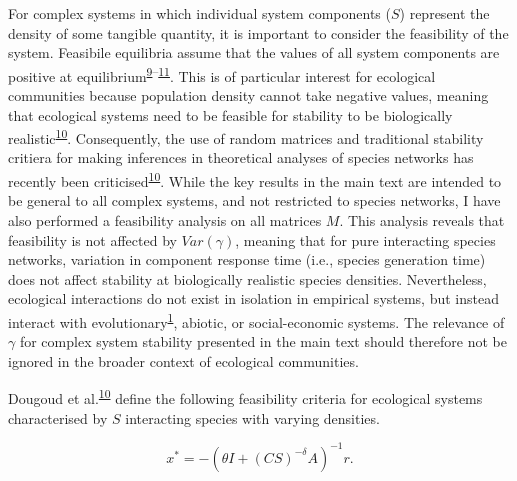 \documentclass[]{article}
\begin{document}
For complex systems in which individual system components (\(S\))
represent the density of some tangible quantity, it is important to
consider the feasibility of the system. Feasibile equilibria assume that
the values of all system components are positive at
equilibrium\textsuperscript{\protect\hyperlink{ref-Grilli2017}{9}--\protect\hyperlink{ref-Song2018}{11}}.
This is of particular interest for ecological communities because
population density cannot take negative values, meaning that ecological
systems need to be feasible for stability to be biologically
realistic\textsuperscript{\protect\hyperlink{ref-Dougoud2018}{10}}.
Consequently, the use of random matrices and traditional stability
critiera for making inferences in theoretical analyses of species
networks has recently been
criticised\textsuperscript{\protect\hyperlink{ref-Dougoud2018}{10}}.
While the key results in the main text are intended to be general to all
complex systems, and not restricted to species networks, I have also
performed a feasibility analysis on all matrices \(M\). This analysis
reveals that feasibility is not affected by \(Var(\gamma)\), meaning
that for pure interacting species networks, variation in component
response time (i.e., species generation time) does not affect stability
at biologically realistic species densities. Nevertheless, ecological
interactions do not exist in isolation in empirical systems, but instead
interact with
evolutionary\textsuperscript{\protect\hyperlink{ref-Patel2018}{1}},
abiotic, or social-economic systems. The relevance of \(\gamma\) for
complex system stability presented in the main text should therefore not
be ignored in the broader context of ecological communities.

Dougoud et al.\textsuperscript{\protect\hyperlink{ref-Dougoud2018}{10}}
define the following feasibility criteria for ecological systems
characterised by \(S\) interacting species with varying densities.

\[x^{*} = -\left(\theta I + (CS)^{-\delta}A\right)^{-1}r.\]
\end{document}
